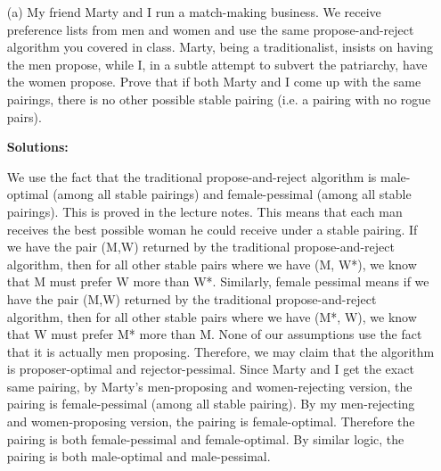 \documentclass[11pt]{article}
\newif\ifsolutions
\renewcommand{\answer}[1]{{\color{mydarkblue}\textbf{Solutions: }#1}}
\begin{document}
\begin{qunlist}
\begin{itemize}
\ifsolutions
\answer{
This proof is incorrect. The use of $\max(x-1, y-1)$ is not correct, 
since $x-1$ and $y-1$ will be negative when $x=0$ or $y=0$.
Then the inductive hypothesis no longer applies, since $x-1$ and $y-1$ 
fall outside the range of natural numbers. We cannot conclude that $x-1 \leq y-1$ and the proof fails.
}
\fi


\end{itemize}


\newpage

\begin{itemize}
\item[(a)] My friend Marty and I run a match-making business. 
We receive preference lists from men and women 
and use the same propose-and-reject algorithm you covered in class. 
Marty, being a traditionalist, insists on having the men propose, 
while I, in a subtle attempt to subvert the patriarchy, have the women propose. 
Prove that if both Marty and I come up with the same pairings, there is no other possible stable pairing 
(i.e. a pairing with no rogue pairs).

\ifsolutions
\answer{

We use the fact that the traditional propose-and-reject algorithm is male-optimal (among all stable pairings) and female-pessimal (among all stable pairings). This is proved in the lecture notes. This means that each man receives the best possible woman he could receive under a stable pairing. If we have the pair (M,W) returned by the traditional propose-and-reject algorithm, then for all other stable pairs where we have (M, W*), we know that M must prefer W more than W*. Similarly, female pessimal means if we have the pair (M,W) returned by the traditional propose-and-reject algorithm, then for all other stable pairs where we have (M*, W), we know that W must prefer M* more than M. None of our assumptions use the fact that it is actually men proposing. Therefore, we may claim that the algorithm is proposer-optimal and rejector-pessimal. 
Since Marty and I get the exact same pairing, by Marty's men-proposing and women-rejecting version, the pairing is female-pessimal (among all stable pairing). By my men-rejecting and women-proposing version, the pairing is female-optimal. Therefore the pairing is both female-pessimal and female-optimal. By similar logic, the pairing is both male-optimal and male-pessimal.

}
\end{itemize}
\end{qunlist}
\end{document}
